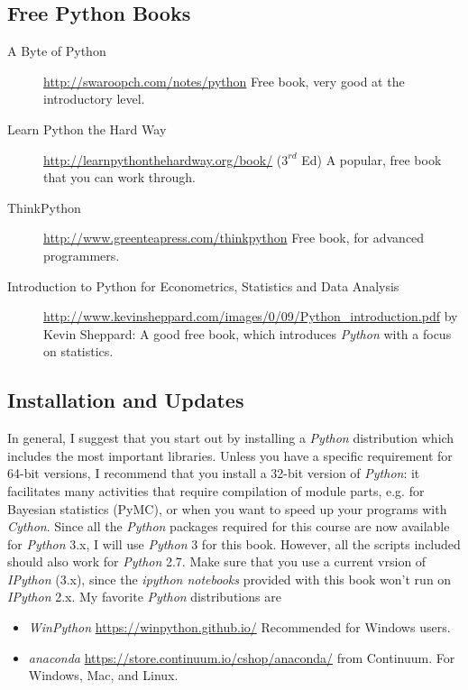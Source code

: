 \subsection{Free Python Books}

\begin{description}
  \item[A Byte of Python] \url{http://swaroopch.com/notes/python} Free book, very good at the introductory level.
  \item[Learn Python the Hard Way] \url{http://learnpythonthehardway.org/book/} ($3^{rd}$ Ed) A popular, free book that you can work through.
  \item[ThinkPython] \url{http://www.greenteapress.com/thinkpython} Free book, for advanced programmers.
  \item[Introduction to Python for Econometrics, Statistics and Data Analysis] \url{http://www.kevinsheppard.com/images/0/09/Python_introduction.pdf} by Kevin Sheppard: A
      good free book, which introduces \emph{Python} with a focus on statistics.
\end{description}

\subsection{Installation and Updates}

In general, I suggest that you start out by installing a \emph{Python} distribution which includes the most important libraries. Unless you have a specific requirement for 64-bit versions, I recommend that you install a 32-bit version of \emph{Python}: it facilitates many activities that require compilation of module parts, e.g. for Bayesian statistics (PyMC), or when you want to speed up your programs with \emph{Cython}. Since all the \emph{Python} packages required for this course are now available for \emph{Python} 3.x, I will use \emph{Python} 3 for this book. However, all the scripts included should also work for \emph{Python} 2.7. Make sure that you use a current vrsion of \emph{IPython} (3.x), since the \emph{ipython notebooks} provided with this book won't run on \emph{IPython} 2.x. My favorite \emph{Python} distributions  are

\begin{itemize}
    \item \emph{WinPython} \url{https://winpython.github.io/} Recommended for Windows users.
    \item \emph{anaconda} \url{https://store.continuum.io/cshop/anaconda/} from Continuum. For Windows, Mac, and Linux.
\end{itemize}

